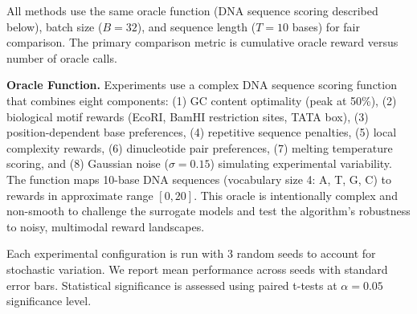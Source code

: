All methods use the same oracle function (DNA sequence scoring described below), batch size ($B = 32$), and sequence length ($T = 10$ bases) for fair comparison. The primary comparison metric is cumulative oracle reward versus number of oracle calls.

\textbf{Oracle Function.} Experiments use a complex DNA sequence scoring function that combines eight components: (1) GC content optimality (peak at 50\%), (2) biological motif rewards (EcoRI, BamHI restriction sites, TATA box), (3) position-dependent base preferences, (4) repetitive sequence penalties, (5) local complexity rewards, (6) dinucleotide pair preferences, (7) melting temperature scoring, and (8) Gaussian noise ($\sigma = 0.15$) simulating experimental variability. The function maps 10-base DNA sequences (vocabulary size 4: A, T, G, C) to rewards in approximate range $[0, 20]$. This oracle is intentionally complex and non-smooth to challenge the surrogate models and test the algorithm's robustness to noisy, multimodal reward landscapes.

Each experimental configuration is run with 3 random seeds to account for stochastic variation. We report mean performance across seeds with standard error bars. Statistical significance is assessed using paired t-tests at $\alpha = 0.05$ significance level.
